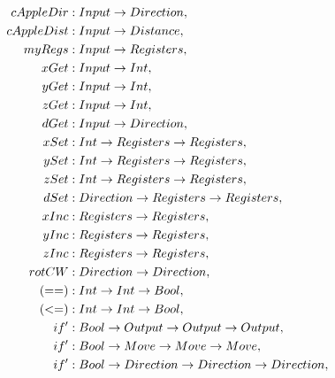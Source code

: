 \documentclass[12pt,a4paper]{report}
\begin{document}
\begin{align*}
cAppleDir        &: Input \ar Direction                             ,\\          
cAppleDist       &: Input \ar Distance                              ,\\        
myRegs           &: Input \ar Registers                             ,\\         
xGet             &: Input \ar Int                                   ,\\     
yGet             &: Input \ar Int                                   ,\\     
zGet             &: Input \ar Int                                   ,\\     
dGet             &: Input \ar Direction                             ,\\          
xSet             &: Int \ar Registers \ar Registers                 ,\\          
ySet             &: Int \ar Registers \ar Registers                 ,\\          
zSet             &: Int \ar Registers \ar Registers                 ,\\          
dSet             &: Direction \ar Registers \ar Registers           ,\\                
xInc             &: Registers \ar Registers                         ,\\              
yInc             &: Registers \ar Registers                         ,\\              
zInc             &: Registers \ar Registers                         ,\\              
rotCW            &: Direction \ar Direction                         ,\\                                                             
(==)             &: Int \ar Int \ar Bool                            ,\\                                      
(<=)             &: Int \ar Int \ar Bool                            ,\\               
if'              &: Bool \ar Output \ar Output \ar Output           ,\\                                  
if'              &: Bool \ar Move \ar Move \ar Move                 ,\\                                  
if'              &: Bool \ar Direction \ar Direction \ar Direction  ,\\              

\end{align*}
\end{document}
